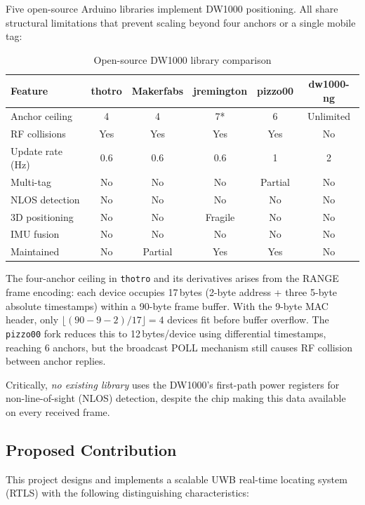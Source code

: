 \documentclass[11pt,a4paper]{article}
\begin{document}
Five open-source Arduino libraries implement DW1000 positioning. All share structural limitations that prevent scaling beyond four anchors or a single mobile tag:

\begin{table}[h!]
\centering
\caption{Open-source DW1000 library comparison}
\begin{tabular}{lccccc}
\toprule
\textbf{Feature} & \textbf{thotro} & \textbf{Makerfabs} & \textbf{jremington} & \textbf{pizzo00} & \textbf{dw1000-ng} \\
\midrule
Anchor ceiling         & 4  & 4  & 7* & 6  & Unlimited \\
RF collisions          & Yes & Yes & Yes & Yes & No \\
Update rate (Hz)       & 0.6 & 0.6 & 0.6 & 1 & 2 \\
Multi-tag              & No & No & No & Partial & No \\
NLOS detection         & No & No & No & No & No \\
3D positioning         & No & No & Fragile & No & No \\
IMU fusion             & No & No & No & No & No \\
Maintained             & No & Partial & Yes & Yes & No \\
\bottomrule
\end{tabular}
\end{table}

The four-anchor ceiling in \texttt{thotro} and its derivatives arises from the RANGE frame encoding: each device occupies 17\,bytes (2-byte address + three 5-byte absolute timestamps) within a 90-byte frame buffer. With the 9-byte MAC header, only $\lfloor(90-9-2)/17\rfloor = 4$ devices fit before buffer overflow. The \texttt{pizzo00} fork reduces this to 12\,bytes/device using differential timestamps, reaching 6 anchors, but the broadcast POLL mechanism still causes RF collision between anchor replies.

Critically, \emph{no existing library} uses the DW1000's first-path power registers for non-line-of-sight (NLOS) detection, despite the chip making this data available on every received frame.

\subsection{Proposed Contribution}

This project designs and implements a scalable UWB real-time locating system (RTLS) with the following distinguishing characteristics:
\end{document}

